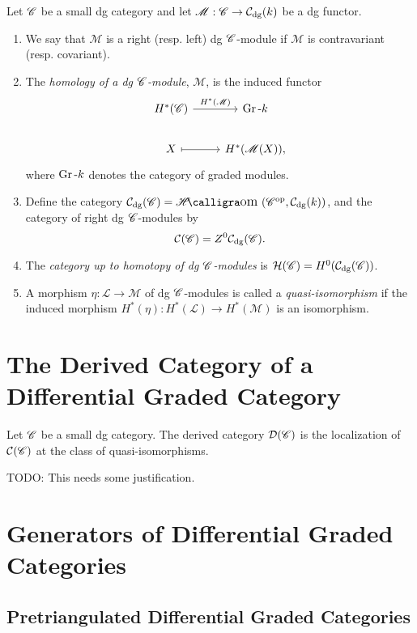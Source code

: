 \documentclass[dissertation.tex]{subfiles}
\begin{document}
\begin{defn}
  Let $\mathscr{C}$ be a small dg category and let $\mathscr{M} : \mathscr{C} \rightarrow \mathcal{C}_\text{dg}(k)$ be a dg functor.
  \begin{enumerate}
  \item
    We say that $\mathscr{M}$ is a right (resp. left) dg $\mathscr{C}$-module if $\mathscr{M}$ is contravariant (resp. covariant).
  \item
    The {\it homology of a dg $\mathscr{C}$-module}, $\mathscr{M}$, is the induced functor
    $$\begin{tikzcd}
      H^\ast(\CC) \arrow{r}{H^\ast(\mathscr{M})}& \Gr{k}\\
      X \arrow[mapsto]{r} & H^\ast(\mathscr{M}(X)),
    \end{tikzcd}$$
    where $\operatorname{Gr}\text{-}k$ denotes the category of graded modules.
  \item
    Define the category $\mathcal{C}_\text{dg}(\CC) = \SHom{\CC^\text{op}, \mathcal{C}_\text{dg}(k)}$, and the category of right dg $\mathscr{C}$-modules by
    $$\mathcal{C}(\mathscr{C}) = Z^0 \mathcal{C}_\text{dg}(\mathscr{C}).$$
  \item
    The {\it category up to homotopy of dg $\mathscr{C}$-modules} is $\mathcal{H}(\mathscr{C}) = H^0(\mathcal{C}_\text{dg}(\mathscr{C}))$.
  \item
    A morphism $\eta \colon \mathscr{L} \rightarrow \mathscr{M}$ of dg $\mathscr{C}$-modules is called a {\it quasi-isomorphism} if the induced morphism $H^\ast(\eta) \colon H^\ast(\mathscr{L}) \rightarrow H^\ast(\mathscr{M})$ is an isomorphism.
  \end{enumerate}
\end{defn}

\section{The Derived Category of a Differential Graded Category}
\begin{defn}
  Let $\mathscr{C}$ be a small dg category.
  The derived category $\mathcal{D}(\mathscr{C})$ is the localization of $\mathcal{C}(\mathscr{C})$ at the class of quasi-isomorphisms.

  TODO: This needs some justification.
\end{defn}

\section{Generators of Differential Graded Categories}
\subsection{Pretriangulated Differential Graded Categories}
\end{document}
